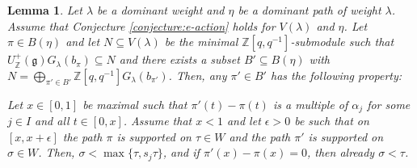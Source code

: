 \documentclass[final]{amsart}
\theoremstyle{plain}
\newtheorem{lemma}[corollary]{Lemma}
\theoremstyle{definition}
\newcommand{\bbZ}{\mathbb Z}
\newcommand{\frakg}{\mathfrak g}
\begin{document}
\begin{lemma}
    \label{lemma:e-action-estimation}
    Let $\lambda$ be a dominant weight and $\eta$ be a dominant path of weight $\lambda$.
    Assume that Conjecture \ref{conjecture:e-action} holds for $V(\lambda)$ and $\eta$.
    Let $\pi \in B(\eta)$ and let $N \subseteq V(\lambda)$ be the minimal $\bbZ[q,q^{-1}]$-submodule such that $U_\bbZ^+(\frakg) G_\lambda(b_\pi) \subseteq N$ and there exists a subset $B' \subseteq B(\eta)$ with $N = \bigoplus_{\pi' \in B'} \bbZ[q,q^{-1}] G_\lambda(b_{\pi'})$.
    Then, any $\pi' \in B'$ has the following property:

    Let $x \in [0, 1]$ be maximal such that $\pi'(t) - \pi(t)$ is a multiple of $\alpha_j$ for some $j \in I$ and all $t \in [0, x]$.
    Assume that $x < 1$ and let $\epsilon > 0$ be such that on $[x, x+\epsilon]$ the path $\pi$ is supported on $\tau \in W$ and the path $\pi'$ is supported on $\sigma \in W$.
    Then, $\sigma < \max\{\tau, s_j\tau\}$, and if $\pi'(x) - \pi(x) = 0$, then already $\sigma < \tau$.
\end{lemma}
\end{document}
